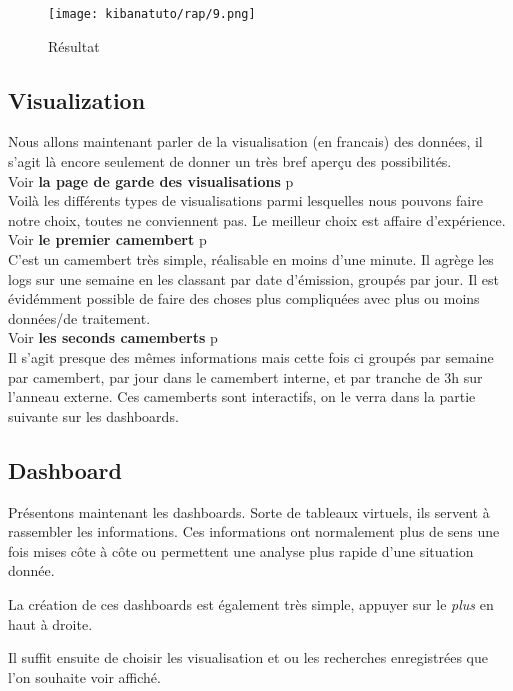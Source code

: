 \begin{figure}[H]
\center
\texttt{[image: kibanatuto/rap/9.png]}
\label{fig:kibanatuto6}
\caption{Résultat}
\end{figure}

\subsection{Visualization}
Nous allons maintenant parler de la visualisation (en francais) des données, il s'agit là encore
seulement de donner un très bref aperçu des possibilités.\\[2mm]
Voir \textbf{la page de garde des visualisations} p\pageref{fig:kibanatuto7}\\[2mm]
Voilà les différents types de visualisations parmi lesquelles nous pouvons faire 
notre choix,  toutes ne conviennent pas. Le meilleur choix est affaire d'expérience.\\[2mm]
Voir \textbf{le premier camembert} p\pageref{fig:kibanatuto8}\\[2mm]
C'est un camembert très simple, réalisable en moins d'une minute. Il agrège les logs
sur une semaine en les classant par date d'émission, groupés par jour. 
Il est évidémment possible de faire des choses plus compliquées avec plus ou moins
données/de traitement.\\[2mm]
Voir \textbf{les seconds camemberts} p\pageref{fig:kibanatuto9}\\[2mm]
Il s'agit presque des mêmes informations mais cette fois ci groupés par semaine
par camembert, par jour dans le camembert interne, et par tranche de 3h sur l'anneau
externe. Ces camemberts sont interactifs, on le verra dans la partie suivante sur 
les dashboards.


\subsection{Dashboard}
Présentons maintenant les dashboards. Sorte de tableaux virtuels, ils servent à rassembler
les informations. Ces informations ont normalement plus de sens une fois mises côte 
à côte ou permettent une analyse plus rapide d'une situation donnée.

La création de ces dashboards est également très simple, appuyer sur le \textit{plus}
en haut à droite.

Il suffit ensuite de choisir les visualisation et ou les recherches enregistrées 
que l'on souhaite voir affiché.\\[2mm]

